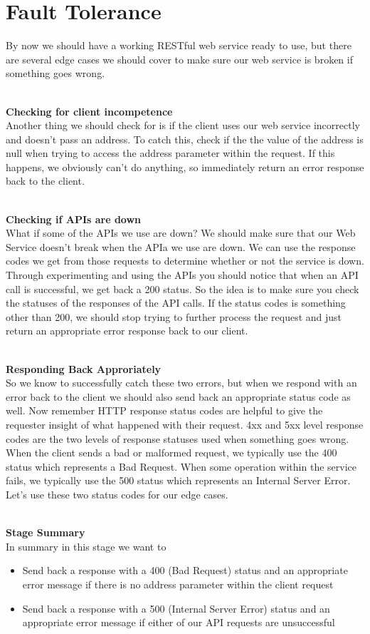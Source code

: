\documentclass{article}
\begin{document}
\section{Fault Tolerance}

By now we should have a working RESTful web service ready to use, but there are several edge cases we should cover to make sure our web service is broken if something goes wrong.

\-\ \\
\textbf{Checking for client incompetence} \\
Another thing we should check for is if the client uses our web service incorrectly and doesn't pass an address. To catch this, check if the the value of the address is null when trying to access the address parameter within the request. If this happens, we obviously can't do anything, so immediately return an error response back to the client. 

\-\ \\
\textbf{Checking if APIs are down}\\
What if some of the APIs we use are down? We should make sure that our Web Service doesn't break when the APIa we use are down. We can use the response codes we get from those requests to determine whether or not the service is down. Through experimenting and using the APIs you should notice that when an API call is successful, we get back a 200 status. So the idea is to make sure you check the statuses of the responses of the API calls. If the status codes is something other than 200, we should stop trying to further process the request and just return an appropriate error response back to our client. 

\-\ \\
\textbf{Responding Back Approriately}\\
So we know to successfully catch these two errors, but when we respond with an error back to the client we should also send back an appropriate status code as well. Now remember HTTP response status codes are helpful to give the requester insight of what happened with their request. 4xx and 5xx level response codes are the two levels of response statuses used when something goes wrong. When the client sends a bad or malformed request, we typically use the 400 status which represents a Bad Request. When some operation within the service fails, we typically use the 500 status which represents an Internal Server Error. Let's use these two status codes for our edge cases.

\-\ \\
\textbf{Stage Summary}\\
In summary in this stage we want to
\begin{itemize}
\item Send back a response with a 400 (Bad Request) status and an appropriate error message if there is no address parameter within the client request
\item Send back a response with a  500 (Internal Server Error) status and an appropriate error message if either of our API requests are unsuccessful
\end{itemize}
\end{document}

